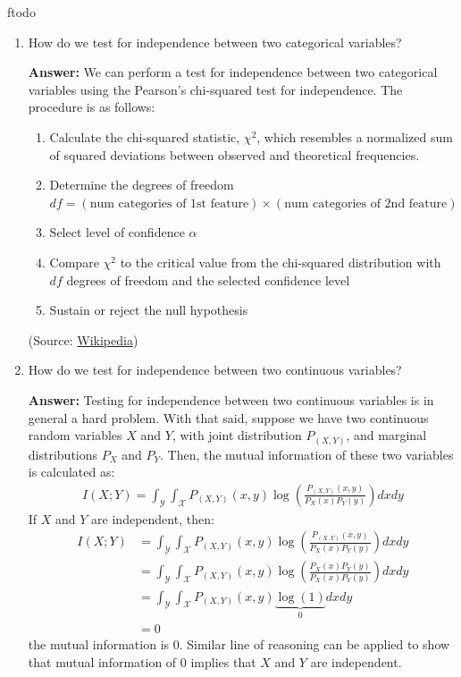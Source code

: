 ƒtodo\documentclass{article}
\newenvironment{QandA}{\begin{enumerate}[label=\arabic*.]}{\end{enumerate}}
\newenvironment{InnerQandA}{\begin{enumerate}[label=\roman*.]}{\end{enumerate}}
\newenvironment{answer}{\par\normalfont \textbf{Answer:}}{}
\begin{document}
\begin{QandA}
\begin{InnerQandA}
        \item How do we test for independence between two categorical variables?
        \begin{answer}
            We can perform a test for independence between two categorical variables using the Pearson's chi-squared test for independence. The procedure is as follows:
            \begin{enumerate}[label={\arabic*.}]
                \item Calculate the chi-squared statistic, $\chi^2$, which resembles a normalized sum of squared deviations between observed and theoretical frequencies. 
                \item Determine the degrees of freedom $df = (\text{num categories of 1st feature}) \times (\text{num categories of 2nd feature})$
                \item Select level of confidence $\alpha$
                \item Compare $\chi^2$ to the critical value from the chi-squared distribution with $df$ degrees of freedom and the selected confidence level
                \item Sustain or reject the null hypothesis
            \end{enumerate}
            (Source: \href{https://en.wikipedia.org/wiki/Pearson%27s_chi-squared_test}{Wikipedia})
        \end{answer}

        \item How do we test for independence between two continuous variables?
        \begin{answer}
            Testing for independence between two continuous variables is in general a hard problem. With that said, suppose we have two continuous random variables $X$ and $Y$, with joint distribution $P_{(X, Y)}$, and marginal distributions $P_X$ and $P_Y$. Then, the mutual information of these two variables is calculated as:
            \begin{align*}
                I(X; Y) = \int_{\mathcal{Y}} \int_{\mathcal{X}} P_{(X, Y)} (x, y) \log \left( \frac{P_{(X, Y)} (x, y)}{P_X(x) P_Y(y)} \right) dx dy
            \end{align*}
            If $X$ and $Y$ are independent, then:
            \begin{align*}
                I(X; Y) &= \int_{\mathcal{Y}} \int_{\mathcal{X}} P_{(X, Y)} (x, y) \log \left( \frac{P_{(X, Y)} (x, y)}{P_X(x) P_Y(y)} \right) dx dy \\
                &= \int_{\mathcal{Y}} \int_{\mathcal{X}} P_{(X, Y)} (x, y) \log \left( \frac{P_X(x) P_Y(y)}{P_X(x) P_Y(y)} \right) dx dy \\
                &= \int_{\mathcal{Y}} \int_{\mathcal{X}} P_{(X, Y)} (x, y) \underbrace{\log \left( 1 \right)}_{0} dx dy \\
                &= 0
            \end{align*}
            the mutual information is 0. Similar line of reasoning can be applied to show that mutual information of $0$ implies that $X$ and $Y$ are independent.


\end{answer}
\end{InnerQandA}
\end{QandA}
\end{document}
